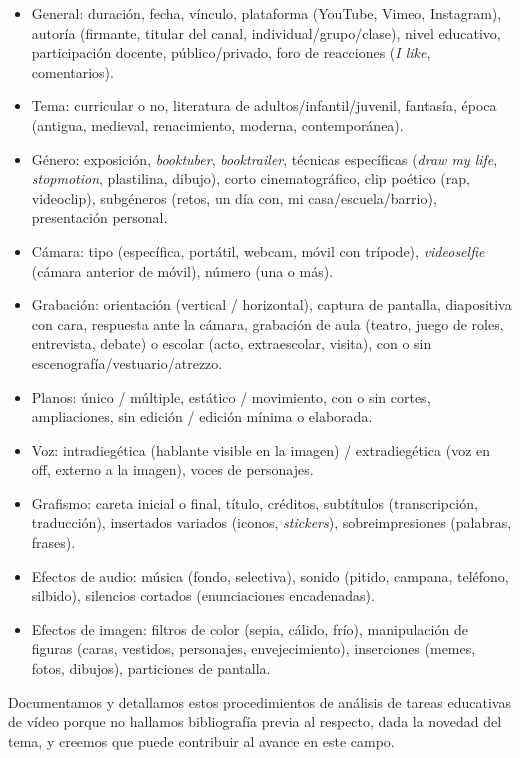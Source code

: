 \documentclass[spanish]{textolivre}
\begin{document}
\begin{itemize}
    \item General: duración, fecha, vínculo, plataforma (YouTube, Vimeo, Instagram), autoría (firmante, titular del canal, individual/grupo/clase), nivel educativo, participación docente, público/privado, foro de reacciones (\textit{I like}, comentarios).
    \item Tema: curricular o no, literatura de adultos/infantil/juvenil, fantasía, época (antigua, medieval, renacimiento, moderna, contemporánea).
    \item Género: exposición, \textit{booktuber}, \textit{booktrailer}, técnicas específicas (\textit{draw my life}, \textit{stopmotion}, plastilina, dibujo), corto cinematográfico, clip poético (rap, videoclip), subgéneros (retos, un día con, mi casa/escuela/barrio), presentación personal.
    \item Cámara: tipo (específica, portátil, webcam, móvil con trípode), \textit{videoselfie} (cámara anterior de móvil), número (una o más).
    \item Grabación: orientación (vertical / horizontal), captura de pantalla, diapositiva con cara, respuesta ante la cámara, grabación de aula (teatro, juego de roles, entrevista, debate) o escolar (acto, extraescolar, visita), con o sin escenografía/vestuario/atrezzo.
    \item Planos: único / múltiple, estático / movimiento, con o sin cortes, ampliaciones, sin edición / edición mínima o elaborada.
    \item Voz: intradiegética (hablante visible en la imagen) / extradiegética (voz en off, externo a la imagen), voces de personajes.
    \item Grafismo: careta inicial o final, título, créditos, subtítulos (transcripción, traducción), insertados variados (iconos, \textit{stickers}), sobreimpresiones (palabras, frases).
    \item Efectos de audio: música (fondo, selectiva), sonido (pitido, campana, teléfono, silbido), silencios cortados (enunciaciones encadenadas).
    \item Efectos de imagen: filtros de color (sepia, cálido, frío), manipulación de figuras (caras, vestidos, personajes, envejecimiento), inserciones (memes, fotos, dibujos), particiones de pantalla.
\end{itemize}

Documentamos y detallamos estos procedimientos de análisis de tareas educativas de vídeo porque no hallamos bibliografía previa al respecto, dada la novedad del tema, y creemos que puede contribuir al avance en este campo.
\end{document}
